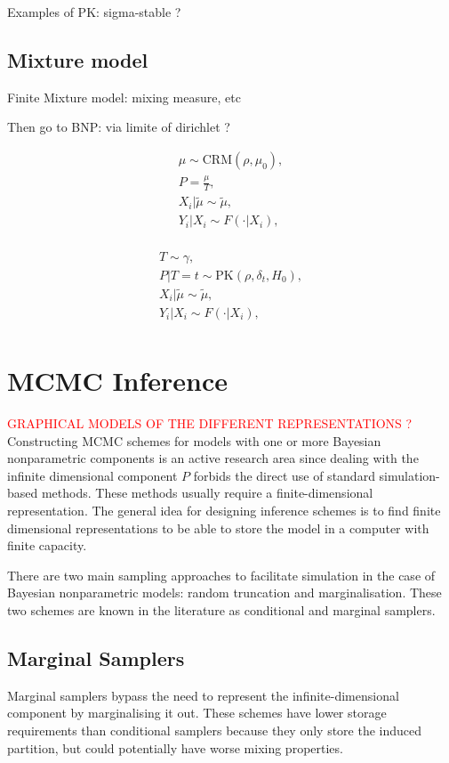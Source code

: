 Examples of PK: sigma-stable ?


\subsection{Mixture model}
Finite Mixture model: mixing measure, etc

Then go to BNP: via limite of dirichlet ?

\begin{gather*}
\mu \sim \text{CRM}(\rho, \mu_0), \\
P = \frac{\mu}{T}, \\
X_i|\tilde{\mu} \sim \tilde{\mu}, \\
Y_i|X_i \sim F(\cdot|X_i), \\
\end{gather*}

\begin{gather*}
T \sim \gamma, \\
P|T=t \sim \text{PK}(\rho, \delta_t, H_0), \\
X_i|\tilde{\mu} \sim \tilde{\mu}, \\
Y_i|X_i \sim F(\cdot|X_i), \\
\end{gather*}

\section{MCMC Inference}
\textcolor{red}{GRAPHICAL MODELS OF THE DIFFERENT REPRESENTATIONS ?}
Constructing MCMC schemes for models with one or more Bayesian nonparametric components is an active research area since dealing with the infinite dimensional component $P$ forbids the direct use of standard simulation-based methods. These methods usually require a finite-dimensional representation. The general idea for designing inference schemes is to find finite dimensional representations to be able to store the model in a computer with finite capacity.

There are two main sampling approaches to facilitate simulation in the case of Bayesian nonparametric models: random truncation and marginalisation. These two schemes are known in the literature as conditional and marginal samplers.

\subsection{Marginal Samplers}
Marginal samplers bypass the need to represent the infinite-dimensional component by marginalising it out. These schemes have lower storage requirements than conditional samplers because they only store the induced partition, but could potentially have worse mixing properties.

